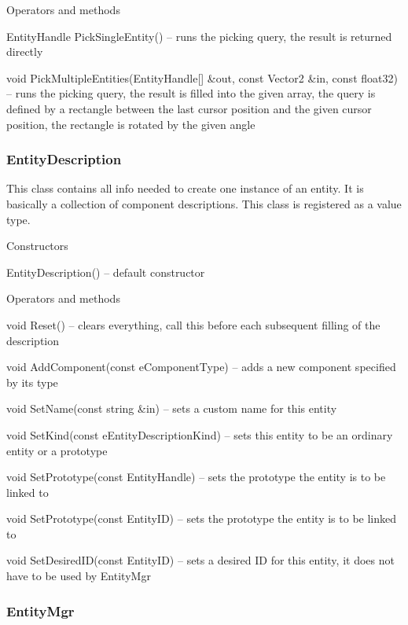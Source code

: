 \begin{titled-itemize}{Operators and methods}
  \item EntityHandle PickSingleEntity() -- runs the picking query, the result is returned directly
  \item void PickMultipleEntities(EntityHandle[] \&out, const Vector2 \&in, const float32) -- runs the picking query, the result is filled into the given array, the query is defined by a rectangle between the last cursor position and the given cursor position, the rectangle is rotated by the given angle
\end{titled-itemize}

\subsubsection{EntityDescription}

This class contains all info needed to create one instance of an entity. It is basically a collection of component descriptions. This class is registered as a value type.

\begin{titled-itemize}{Constructors}
  \item EntityDescription() -- default constructor
\end{titled-itemize}

\begin{titled-itemize}{Operators and methods}
  \item void Reset() -- clears everything, call this before each subsequent filling of the description
  \item void AddComponent(const eComponentType) -- adds a new component specified by its type
  \item void SetName(const string \&in) -- sets a custom name for this entity
  \item void SetKind(const eEntityDescriptionKind) -- sets this entity to be an ordinary entity or a prototype
  \item void SetPrototype(const EntityHandle) -- sets the prototype the entity is to be linked to
  \item void SetPrototype(const EntityID) -- sets the prototype the entity is to be linked to
  \item void SetDesiredID(const EntityID) -- sets a desired ID for this entity, it does not have to be used by EntityMgr
\end{titled-itemize}

\subsubsection{EntityMgr}

